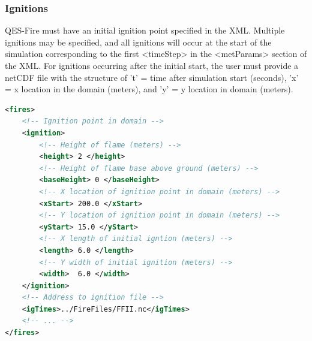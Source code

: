 \subsubsection{Ignitions}

QES-Fire must have an initial ignition point specified in the XML. Multiple ignitions may be specified, and all ignitions will occur at the start of the simulation corresponding to the first <timeStep> in the <metParams> section of the XML. For ignitions occurring after the initial start, the user must provide a netCDF file with the structure of 't' = time after simulation start (seconds), 'x' = x location in the domain (meters), and 'y' = y location in domain (meters).

\begin{lstlisting}[language=XML]
<fires>
    <!-- Ignition point in domain -->
    <ignition>
        <!-- Height of flame (meters) -->
        <height> 2 </height>
        <!-- Height of flame base above ground (meters) --> 
        <baseHeight> 0 </baseHeight>
        <!-- X location of ignition point in domain (meters) -->
        <xStart> 200.0 </xStart>
        <!-- Y location of ignition point in domain (meters) -->
        <yStart> 15.0 </yStart>
        <!-- X length of initial igntion (meters) -->
        <length> 6.0 </length>
        <!-- Y width of initial ignition (meters) -->
        <width>  6.0 </width>
    </ignition>
    <!-- Address to ignition file -->
    <igTimes>../FireFiles/FFII.nc</igTimes>
    <!-- ... -->
</fires>
\end{lstlisting}

